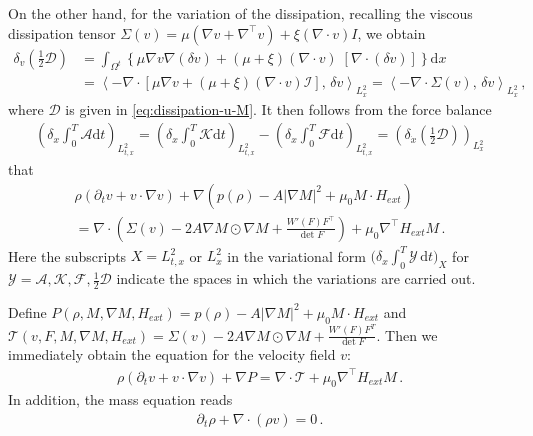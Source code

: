 \documentclass[reqno,11pt]{amsart}
\numberwithin{equation}{section}
\def\p{\partial}
\def\d{\mathrm{d}}
\def\no{\nonumber}
\def\Id{\mathcal{I}}
\newcommand{\skpa}[2]{\left\langle #1,\, #2 \right\rangle}
\begin{document}
On the other hand, for the variation of the dissipation, recalling the viscous dissipation tensor $\Sigma (v) = \mu (\nabla v + \nabla^\top v) + \xi (\nabla \cdot v) I $, we obtain 
  \begin{align}\label{eq:D-vari-v}
    \delta_{v} \left( \tfrac{1}{2}\mathcal{D} \right) 
    & = \int_{\Omega^t} \left\{ \mu \nabla v \nabla (\delta v) + (\mu + \xi) (\nabla \cdot v)\; [\nabla \cdot (\delta v)] \right\} \d x 
    \\\no & 
    = \skpa{-\nabla \cdot \left[ \mu \nabla v + (\mu + \xi) (\nabla \cdot v) \Id \right] }{\delta v}_{L^2_x} 
    = \skpa{-\nabla \cdot \Sigma (v) }{\delta v}_{L^2_x} \,,
  \end{align}
  where $\mathcal{D}$ is given in \eqref{eq:dissipation-u-M}. It then follows from the force balance 
\begin{align}\label{eq:force-balance-x}
  \left( \delta_x \int_0^T \mathcal{A} \d t \right)_{ L^2_{t,x} }  = \left( \delta_x \int_0^T \mathcal{K} \d t \right)_{ L^2_{t,x} } - \left( \delta_x \int_0^T \mathcal{F} \d t \right)_{ L^2_{t,x} } =  \left( \delta_{\dot{x}} ( \tfrac{1}{2}\mathcal{D} ) \right)_{ L^2_{x} }
\end{align} 
that
  \begin{multline}\label{eq:momentum}
    \rho (\p_t v + v \cdot \nabla v) + \nabla \left( p(\rho) - A |\nabla M|^2 + \mu_0 M \cdot H_{ext} \right) 
    \\ 
    = \nabla \cdot \left( \Sigma (v) - 2 A \nabla M \odot \nabla M + \tfrac{W'(F)F^\top}{\det F} \right) + \mu_0 \nabla^\top H_{ext} M \,. 
  \end{multline}
  Here the subscripts $X = L^2_{t,x}$ or $L^2_x$ in the variational form $\bigl( \delta_x \int_0^T \mathcal{Y} \,\mathrm{d} t \bigr)_X$ for $\mathcal{Y} = \mathcal{A}, \mathcal{K}, \mathcal{F}, \frac{1}{2}\mathcal{D}$ indicate the spaces in which the variations are carried out.
  
Define $P (\rho, M, \nabla M, H_{ext}) = p(\rho) - A |\nabla M|^2 + \mu_0 M \cdot H_{ext} $ and $\mathcal{T} (v, F, M, \nabla M, H_{ext}) = \Sigma (v) - 2 A \nabla M \odot \nabla M + \tfrac{W'(F)F^T}{\det F} $. Then we immediately obtain the equation for the velocity field \(v\):
  \begin{align}
    \rho (\p_t v + v \cdot \nabla v) + \nabla P = \nabla \cdot \mathcal{T} + \mu_0 \nabla^\top H_{ext} M \,. 
  \end{align}
In addition, the mass equation reads
  \begin{align}
     \p_t \rho + \nabla \cdot (\rho v) = 0 \,. 
  \end{align}
\end{document}
